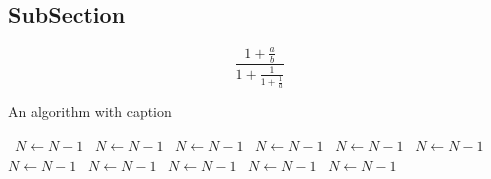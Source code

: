 \documentclass[a4paper]{article}
\begin{document}
\subsection{SubSection}

\[ \frac{1+\frac{a}{b}}{1+\frac{1}{1+\frac{1}{a}}} \]

\begin{algorithm}
\caption{An algorithm with caption}
\begin{algorithmic}
\    \State $N \gets N - 1$
\    \State $N \gets N - 1$
\    \State $N \gets N - 1$
\    \State $N \gets N - 1$
\    \State $N \gets N - 1$
\    \State $N \gets N - 1$
\    \State $N \gets N - 1$
\    \State $N \gets N - 1$
\    \State $N \gets N - 1$
\    \State $N \gets N - 1$
\    \State $N \gets N - 1$
\EndWhile
\end{algorithmic}
\end{algorithm}
\end{document}
